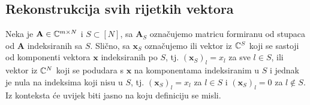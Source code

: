\documentclass[a4paper,twoside,12pt]{memoir} %
\newcommand{\vect}[1]{\mathbf{#1}}
\begin{document}
\subsection[Rekonstrukcija svih rijetkih vektora][Rekonstrukcija svih rijetkih vektora]{Rekonstrukcija svih rijetkih vektora}
Neka je $\vect{A} \in \C^{m \times N}$ i $S \subset [N]$, sa $\vect A_S$ ozna\v{c}ujemo matricu formiranu od stupaca od $\vect A$ indeksiranih sa $S$. Sli\v{c}no, sa $\vect x_S$ ozna\v{c}ujemo ili vektor iz $\mathbb{C}^{S}$ koji se sastoji od komponenti vektora $\vect x$ indeksiranih po $S$, tj. $(\vect x_S)_l = x_l$ za sve $l \in S$, ili vektor iz $\mathbb{C}^N$ koji se podudara s $\vect x$ na komponentama indeksiranim u $S$ i jednak je nula na indeksima koji nisu u $S$, tj. $(\vect x_S)_l = x_l$ za $l \in S$ i $(\vect x_S)_l =0$ za $ l \notin S$. Iz konteksta \'ce uvijek biti jasno na koju definiciju se misli.
\end{document}
